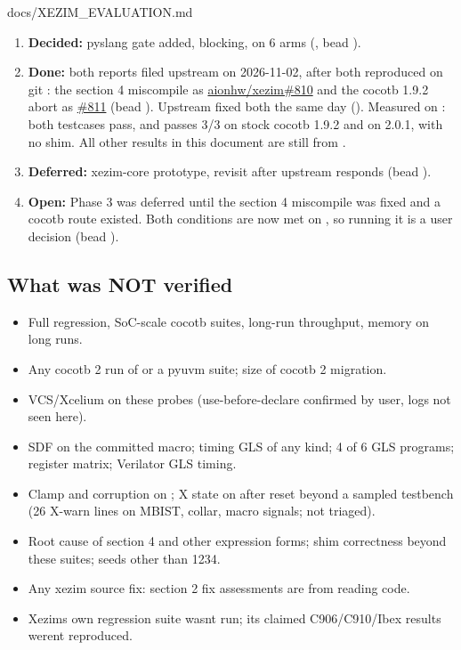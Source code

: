 \begin{relocated}{docs/XEZIM_EVALUATION.md}
\begin{enumerate}
\def\labelenumi{\arabic{enumi}.}
\tightlist
\item
  \textbf{Decided:} pyslang gate added, blocking, on 6 arms
  (, bead ).
\item
  \textbf{Done:} both reports filed upstream on 2026-11-02, after both
  reproduced on git : the section 4 miscompile as
  \href{https://github.com/aionhw/xezim/issues/810}{aionhw/\allowbreak{}xezim\#810}
  and the cocotb 1.9.2 abort as
  \href{https://github.com/aionhw/xezim/issues/811}{\#811} (bead
  ). Upstream fixed both the same day ().
  Measured on : both testcases pass, and
   passes 3/3 on stock cocotb 1.9.2 and on
  2.0.1, with no shim. All other results in this document are still from
  .
\item
  \textbf{Deferred:} xezim-core prototype, revisit after upstream
  responds (bead ).
\item
  \textbf{Open:} Phase 3 was deferred until the section 4 miscompile was
  fixed and a cocotb route existed. Both conditions are now met on
  , so running it is a user decision (bead ).
\end{enumerate}

\subsection{What was NOT verified}\label{tm:dec:xezim:10-what-was-not-verified}

\begin{itemize}
\tightlist
\item
  Full regression, SoC-scale cocotb suites, long-run throughput, memory
  on long runs.
\item
  Any cocotb 2 run of  or a pyuvm suite; size of cocotb
  2 migration.
\item
  VCS/\allowbreak{}Xcelium on these probes (use-before-declare confirmed
  by user, logs not seen here).
\item
  SDF on the committed macro; timing GLS of any kind; 4 of 6 GLS
  programs; register matrix; Verilator GLS timing.
\item
  Clamp and corruption on ; X state on 
  after reset beyond a sampled testbench (26 X-warn lines on MBIST,
  collar, macro signals; not triaged).
\item
  Root cause of section 4 and other expression forms; shim correctness
  beyond these suites; seeds other than 1234.
\item
  Any xezim source fix: section 2 fix assessments are from reading code.
\item
  Xezim\textquotesingle s own regression suite wasn\textquotesingle t
  run; its claimed C906/\allowbreak{}C910/\allowbreak{}Ibex results
  weren\textquotesingle t reproduced.
\end{itemize}
\end{relocated}

